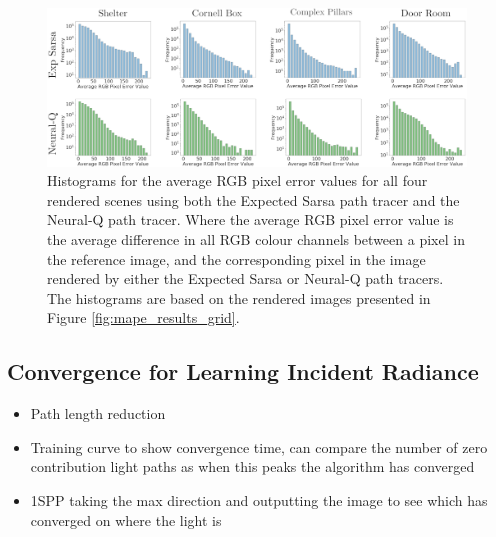 \documentclass[../dissertation.tex]{subfiles}
\begin{document}
\begin{figure}[h]
\begin{center}
\includegraphics[width=0.99\textwidth]{images/noise_diff.png}    
\end{center}
\caption{Histograms for the average RGB pixel error values for all four rendered scenes using both the Expected Sarsa path tracer and the Neural-Q path tracer. Where the average RGB pixel error value is the average difference in all RGB colour channels between a pixel in the reference image, and the corresponding pixel in the image rendered by either the Expected Sarsa or Neural-Q path tracers. The histograms are based on the rendered images presented in Figure \ref{fig:mape_results_grid}.}
\label{fig:histogram_errors}
\end{figure}

\subsection{Convergence for Learning Incident Radiance}
\begin{itemize}
\item Path length reduction
\item Training curve to show convergence time, can compare the number of zero contribution light paths as when this peaks the algorithm has converged
\item 1SPP taking the max direction and outputting the image to see which has converged on where the light is
\end{itemize}
\end{document}
